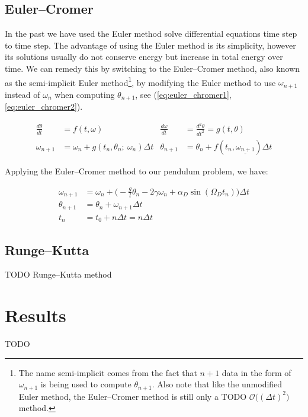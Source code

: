 \documentclass[notitlepage,aps,prd,nofootinbib]{revtex4-1}
\DeclareRobustCommand{\orderof}{\ensuremath{\mathcal{O}}}
\begin{document}
\subsection{Euler--Cromer}
\label{subsec:eulercromer}
In the past we have used the Euler method solve differential equations time step to time step. The advantage of using the Euler method is its simplicity, however its solutions usually do not conserve energy but increase in total energy over time. We can remedy this by switching to the Euler--Cromer method, also known as the semi-implicit Euler method\footnote{The name semi-implicit comes from the fact that $n+1$ data in the form of $\omega_{n+1}$ is being used to compute $\theta_{n+1}$. Also note that like the unmodified Euler method, the Euler--Cromer method is still only a TODO $\orderof\big(\left(\Delta t\right)^2\big)$ method.}, by modifying the Euler method to use $\omega_{n+1}$ instead of $\omega_{n}$ when computing $\theta_{n+1}$, see (\ref{eq:euler_chromer1}, \ref{eq:euler_chromer2}).

\begin{align}
\frac{d \theta}{d t} &= f\left(t, \omega\right) &
\frac{d \omega}{d t} &= \frac{d^2 \theta}{d t^2} = g\left(t, \theta\right) \label{eq:euler_chromer1} \\
\omega_{n+1} &= \omega_{n} + g\left(t_{n}, \theta_{n};~\omega_{n}\right) \Delta t & 
\theta_{n+1} &= \theta_{n} + f\left(t_{n}, \underline{\omega_{n+1}}\right) \Delta t \label{eq:euler_chromer2}
\end{align}

Applying the Euler--Cromer method to our pendulum problem, we have:

\begin{align} \label{eq:euler_chromer_applied}
\omega_{n+1} &= \omega_{n} + \bigg( -\frac{g}{l}\theta_{n} - 2\gamma \omega_{n} + \alpha_{D}\sin\left(\Omega_{D} t_{n}\right) \bigg) \Delta t \\
\theta_{n+1} &= \theta_{n} + \omega_{n+1} \Delta t \\
t_{n} &= t_{0} + n \Delta t = n \Delta t
\end{align}


\subsection{Runge--Kutta}
\label{subsec:runge_kutta}
TODO
Runge--Kutta method


\clearpage
\section{Results}
\label{sec:results}
TODO
\end{document}
